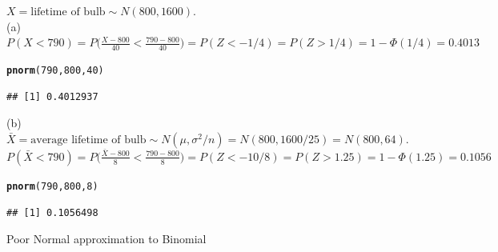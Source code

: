 \documentclass[bigtut]{tutorial}\usepackage[]{graphicx}\usepackage[]{color}
\makeatletter
\newcommand{\hlnum}[1]{\textcolor[rgb]{0.686,0.059,0.569}{#1}}%
\newcommand{\hlstd}[1]{\textcolor[rgb]{0.345,0.345,0.345}{#1}}%
\newcommand{\hlkwd}[1]{\textcolor[rgb]{0.737,0.353,0.396}{\textbf{#1}}}%
\newenvironment{kframe}{%
 \def\at@end@of@kframe{}%
 \ifinner\ifhmode%
  \def\at@end@of@kframe{\end{minipage}}%
  \begin{minipage}{\columnwidth}%
 \fi\fi%
 \def\FrameCommand##1{\hskip\@totalleftmargin \hskip-\fboxsep
 \colorbox{shadecolor}{##1}\hskip-\fboxsep
     \hskip-\linewidth \hskip-\@totalleftmargin \hskip\columnwidth}%
 \MakeFramed {\advance\hsize-\width
   \@totalleftmargin\z@ \linewidth\hsize
   \@setminipage}}%
 {\par\unskip\endMakeFramed%
 \at@end@of@kframe}
\newenvironment{knitrout}{}{} %
\makeatother
\begin{document}
\begin{tutorial}
\begin{questions}
\begin{parts}
  \end{parts}


\begin{solution}
$X = \text{lifetime of bulb} \sim N(800,1600)$. \\
                        
(a)
$P( X < 790) = P \big( \frac{X-800}{40} < \frac{790-800}{40} \big) = P(Z < -1/4) = P(Z > 1/4) = 1-\Phi(1/4) =0.4013$ \\

\begin{knitrout}
\color{fgcolor}\begin{kframe}
\begin{alltt}
\hlkwd{pnorm}\hlstd{(}\hlnum{790}\hlstd{,}\hlnum{800}\hlstd{,}\hlnum{40}\hlstd{)}
\end{alltt}
\begin{verbatim}
## [1] 0.4012937
\end{verbatim}
\end{kframe}
\end{knitrout}

\vspace{.5cm}
(b)
$\bar{X} = \text{average lifetime of bulb} \sim N(\mu, \sigma^2/n) = N(800,1600/25) = N(800,64)$. \\
 
$P( \bar{X} < 790) = P \big( \frac{\bar{X}-800}{8} < \frac{790-800}{8} \big) = P(Z < -10/8) = P(Z > 1.25) = 1-\Phi(1.25) =0.1056$ \\

\begin{knitrout}
\color{fgcolor}\begin{kframe}
\begin{alltt}
\hlkwd{pnorm}\hlstd{(}\hlnum{790}\hlstd{,}\hlnum{800}\hlstd{,}\hlnum{8}\hlstd{)}
\end{alltt}
\begin{verbatim}
## [1] 0.1056498
\end{verbatim}
\end{kframe}
\end{knitrout}
 \end{solution}





\question   Poor Normal approximation to Binomial \\

\end{questions}
\end{tutorial}
\end{document}
